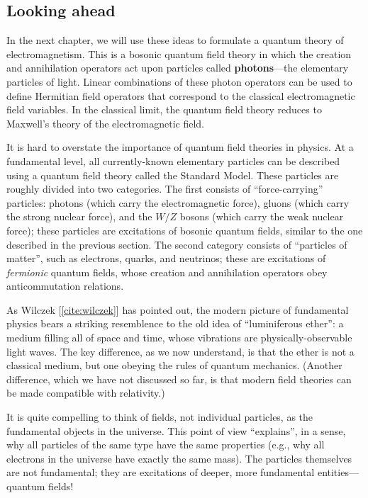 \documentclass[prx,12pt]{revtex4-2}
\begin{document}
\subsection{Looking ahead}
\label{sec:outlook}

In the next chapter, we will use these ideas to formulate a quantum
theory of electromagnetism.  This is a bosonic quantum field theory in
which the creation and annihilation operators act upon particles
called \textbf{photons}---the elementary particles of light.  Linear
combinations of these photon operators can be used to define Hermitian
field operators that correspond to the classical electromagnetic field
variables.  In the classical limit, the quantum field theory reduces
to Maxwell's theory of the electromagnetic field.

It is hard to overstate the importance of quantum field theories in
physics.  At a fundamental level, all currently-known elementary
particles can be described using a quantum field theory called the
Standard Model.  These particles are roughly divided into two
categories.  The first consists of ``force-carrying'' particles:
photons (which carry the electromagnetic force), gluons (which carry
the strong nuclear force), and the $W/Z$ bosons (which carry the weak
nuclear force); these particles are excitations of bosonic quantum
fields, similar to the one described in the previous section.  The
second category consists of ``particles of matter'', such as
electrons, quarks, and neutrinos; these are excitations of
\textit{fermionic} quantum fields, whose creation and annihilation
operators obey anticommutation relations.

As Wilczek [\ref{cite:wilczek}] has pointed out, the modern picture of
fundamental physics bears a striking resemblence to the old idea of
``luminiferous ether'': a medium filling all of space and time, whose
vibrations are physically-observable light waves.  The key difference,
as we now understand, is that the ether is not a classical medium, but
one obeying the rules of quantum mechanics.  (Another difference,
which we have not discussed so far, is that modern field theories can
be made compatible with relativity.)

It is quite compelling to think of fields, not individual particles,
as the fundamental objects in the universe.  This point of view
``explains'', in a sense, why all particles of the same type have the
same properties (e.g., why all electrons in the universe have exactly
the same mass).  The particles themselves are not fundamental; they
are excitations of deeper, more fundamental entities---quantum fields!
\end{document}
